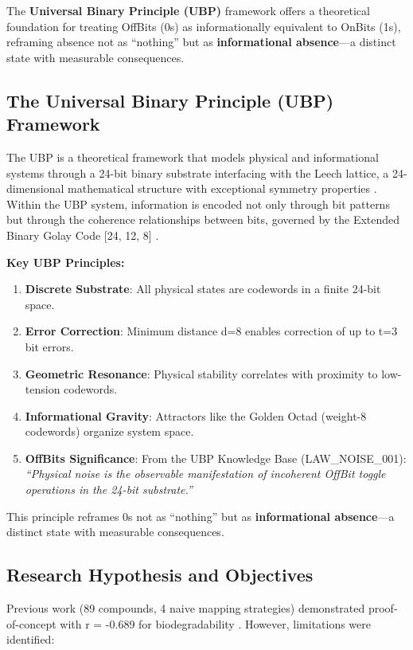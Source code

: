 \documentclass[11pt,letterpaper]{article}
\begin{document}
The \textbf{Universal Binary Principle (UBP)} framework offers a theoretical foundation for treating OffBits (0s) as informationally equivalent to OnBits (1s), reframing absence not as ``nothing'' but as \textbf{informational absence}—a distinct state with measurable consequences.

\subsection{The Universal Binary Principle (UBP) Framework}

The UBP is a theoretical framework that models physical and informational systems through a 24-bit binary substrate interfacing with the Leech lattice, a 24-dimensional mathematical structure with exceptional symmetry properties \cite{conway1999sphere}. Within the UBP system, information is encoded not only through bit patterns but through the coherence relationships between bits, governed by the Extended Binary Golay Code [24, 12, 8] \cite{berlekamp1974algebraic, MacWilliams1977}.

\textbf{Key UBP Principles:}
\begin{enumerate}
    \item \textbf{Discrete Substrate}: All physical states are codewords in a finite 24-bit space.
    \item \textbf{Error Correction}: Minimum distance d=8 enables correction of up to t=3 bit errors.
    \item \textbf{Geometric Resonance}: Physical stability correlates with proximity to low-tension codewords.
    \item \textbf{Informational Gravity}: Attractors like the Golden Octad (weight-8 codewords) organize system space.
    \item \textbf{OffBits Significance}: From the UBP Knowledge Base (LAW\_NOISE\_001): \textit{``Physical noise is the observable manifestation of incoherent OffBit toggle operations in the 24-bit substrate.''}
\end{enumerate}

This principle reframes 0s not as ``nothing'' but as \textbf{informational absence}—a distinct state with measurable consequences.

\subsection{Research Hypothesis and Objectives}

Previous work (89 compounds, 4 naive mapping strategies) demonstrated proof-of-concept with r = -0.689 for biodegradability \cite{Craig2026}. However, limitations were identified:
\end{document}

